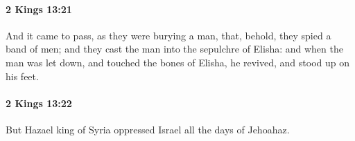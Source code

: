 		\paragraph{2 Kings 13:21} %
			\label{2KINGS-13-21}

			And it came to pass, as they were burying a man, that, behold, they spied a band of men; and they cast the man into the sepulchre of Elisha: and when the man was let down, and touched the bones of Elisha, he revived, and stood up on his feet.


		\paragraph{2 Kings 13:22} %
			\label{2KINGS-13-22}

			But Hazael king of Syria oppressed Israel all the days of Jehoahaz.


